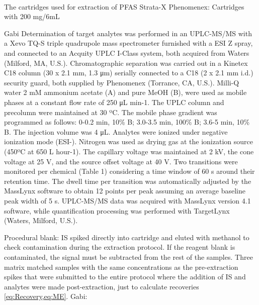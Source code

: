  The cartridges used for extraction of PFAS  Strata\textsuperscript{\textregistered}-X Phenomenex: Cartridges with  200 mg/6mL 
 
 Gabi
 Determination of target analytes was performed in an UPLC-MS/MS with a Xevo TQ-S triple quadrupole mass spectrometer furnished with a ESI Z spray, and connected to an Acquity UPLC I-Class system, both acquired from Waters (Milford, MA, U.S.). Chromatographic separation was carried out in a Kinetex C18 column (30 x 2.1 mm, 1.3 μm) serially connected to a C18 (2 x 2.1 mm i.d.) security guard, both supplied by Phenomenex (Torrance, CA, U.S.). Milli-Q water 2 mM ammonium acetate (A) and pure MeOH (B), were used as mobile phases at a constant flow rate of 250 μL min-1. The UPLC column and precolumn were maintained at 30 ºC. The mobile phase gradient was programmed as follows: 0-0.2 min, 10\% B; 3.0-3.5 min, 100\% B; 3.6-5 min, 10\% B. The injection volume was 4 μL. Analytes were ionized under negative ionization mode (ESI-). Nitrogen was used as drying gas at the ionization source (450ºC at 650 L hour-1). The capillary voltage was maintained at 2 kV, the cone voltage at 25 V, and the source offset voltage at 40 V. Two transitions were monitored per chemical (Table 1) considering a time window of 60 s around their retention time. The dwell time per transition was automatically adjusted by the MassLynx software to obtain 12 points per peak assuming an average baseline peak width of 5 s. 
UPLC-MS/MS data was acquired with MassLynx version 4.1 software, while quantification processing was performed with TargetLynx (Waters, Milford, U.S.).

Procedural blank: IS spiked directly into cartridge and eluted with methanol to check contamination during the extraction protocol. If the reagent blank is contaminated, the signal must be subtracted from the rest of the samples. 
Three matrix matched samples with the same concentrations as the pre-extraction spikes that were submitted to the entire protocol where the addition of IS and analytes were made post-extraction, just to calculate recoveries \cref{eq:Recovery,eq:ME}.
Gabi:

